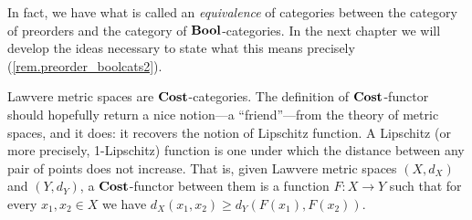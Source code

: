 \documentclass[7Sketches]{subfiles}
\begin{document}
\begin{remark}%
\label{rem.preorder_boolcats}%
In fact, we have what is called an \emph{equivalence} of categories between the
category of preorders and the category of $\mathbf{Bool}$-categories. In the next chapter
we will develop the ideas necessary to state what this means precisely
(\cref{rem.preorder_boolcats2}).
\end{remark}

\begin{example}%
Lawvere metric spaces are $\mathbf{Cost}$-categories. The definition of $\mathbf{Cost}$-functor
should hopefully return a nice notion---a ``friend''---from the theory of metric
spaces, and it does: it recovers the notion of Lipschitz function. A Lipschitz
(or more precisely, 1-Lipschitz) function is one under which the distance between any pair of points does not increase. That is, given Lawvere metric spaces $(X,d_X)$ and $(Y,d_Y)$, a $\mathbf{Cost}$-functor between them is a function $F\colon X\to Y$ such that for every $x_1,x_2\in X$ we have $d_X(x_1,x_2)\geq d_Y(F(x_1),F(x_2))$.
\end{example}
\end{document}
